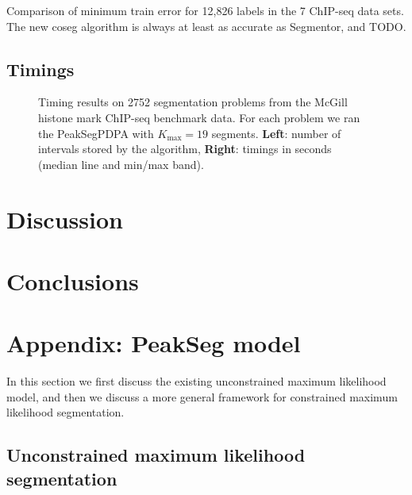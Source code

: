 \documentclass{article}
\begin{document}
\begin{table}[b!]
  \centering
  \caption{Comparison of minimum train error for 12,826 labels in the 7 ChIP-seq data sets. 
    The new coseg algorithm is
    always at least as accurate as Segmentor, and TODO.}
  \label{tab:min-train-error}
\end{table}

\subsection{Timings}

\begin{figure}[b!]
  \centering
  \parbox{0.49\textwidth}{
  }
  \parbox{0.49\textwidth}{
  }
  \caption{Timing results on 2752 segmentation problems from the
    McGill histone mark ChIP-seq benchmark data. For each problem we
    ran the PeakSegPDPA with $K_{\text{max}}=19$ segments.
    \textbf{Left}: number of intervals stored by the algorithm,
    \textbf{Right}: timings in seconds (median line and min/max
    band).}
  \label{fig:timings}
\end{figure}

\section{Discussion}


\section{Conclusions}







\section{Appendix: PeakSeg model}
\label{sec:model}

In this section we first discuss the existing unconstrained maximum
likelihood model, and then we discuss a more general framework for
constrained maximum likelihood segmentation.

\subsection{Unconstrained maximum likelihood segmentation}
\end{document}
